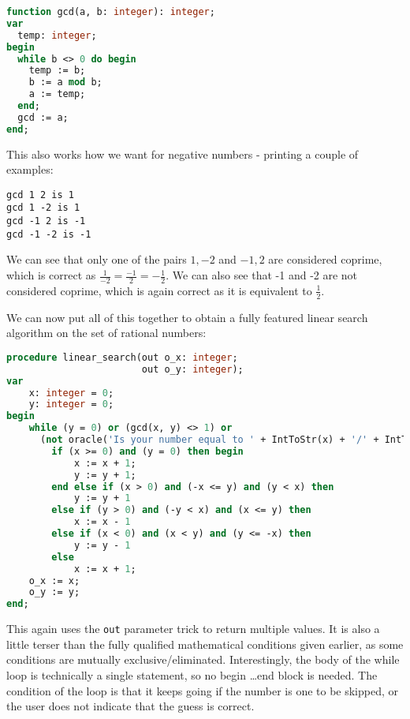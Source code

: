 \documentclass[fleqn,a4paper,11pt]{article}
\begin{document}
\begin{lstlisting}[language=Pascal, caption=Euclid's algorithm in Pascal]
function gcd(a, b: integer): integer;
var
  temp: integer;
begin
  while b <> 0 do begin
    temp := b;
    b := a mod b;
    a := temp;
  end;
  gcd := a;
end;
\end{lstlisting}

    This also works how we want for negative numbers - printing a couple of
    examples:

\begin{lstlisting}[caption=GCD behaviour for negative numbers]
gcd 1 2 is 1
gcd 1 -2 is 1
gcd -1 2 is -1
gcd -1 -2 is -1
\end{lstlisting}

    We can see that only one of the pairs \(1, -2\) and \(-1, 2\) are considered
    coprime, which is correct as \(\frac{1}{-2} = \frac{-1}{2} = -\frac{1}{2}\).
    We can also see that -1 and -2 are not considered coprime, which is again
    correct as it is equivalent to \(\frac{1}{2}\).

    We can now put all of this together to obtain a fully featured linear search
    algorithm on the set of rational numbers:

\begin{lstlisting}[language=Pascal, caption=Linear search on \(\mathbb{Q}\) implementation in Pascal]
procedure linear_search(out o_x: integer;
                        out o_y: integer);
var
    x: integer = 0;
    y: integer = 0;
begin
    while (y = 0) or (gcd(x, y) <> 1) or
      (not oracle('Is your number equal to ' + IntToStr(x) + '/' + IntToStr(y) + '? ')) do
        if (x >= 0) and (y = 0) then begin
            x := x + 1;
            y := y + 1;
        end else if (x > 0) and (-x <= y) and (y < x) then
            y := y + 1
        else if (y > 0) and (-y < x) and (x <= y) then
            x := x - 1
        else if (x < 0) and (x < y) and (y <= -x) then
            y := y - 1
        else
            x := x + 1;
    o_x := x;
    o_y := y;
end;
\end{lstlisting}

    This again uses the \verb|out| parameter trick to return multiple values. It
    is also a little terser than the fully qualified mathematical conditions
    given earlier, as some conditions are mutually exclusive/eliminated.
    Interestingly, the body of the while loop is technically a single statement,
    so no begin \ldots end block is needed. The condition of the loop is that it
    keeps going if the number is one to be skipped, or the user does not
    indicate that the guess is correct.
\end{document}
